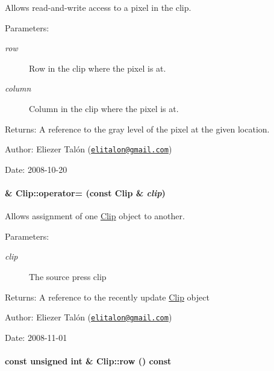 Allows read-and-write access to a pixel in the clip. 

\begin{Desc}
\item[Parameters:]
\begin{description}
\item[{\em row}]Row in the clip where the pixel is at. \item[{\em column}]Column in the clip where the pixel is at.\end{description}
\end{Desc}
\begin{Desc}
\item[Returns:]A reference to the gray level of the pixel at the given location.\end{Desc}
\begin{Desc}
\item[Author:]Eliezer Talón (\href{mailto:elitalon@gmail.com}{\tt elitalon@gmail.com}) \end{Desc}
\begin{Desc}
\item[Date:]2008-10-20 \end{Desc}
\hypertarget{class_clip_8f5c91715408d74402666ab79b952edd}{
\paragraph[{operator=}]{ \& Clip::operator= (const {\bf Clip} \& {\em clip})}\hfill}
\label{class_clip_8f5c91715408d74402666ab79b952edd}


Allows assignment of one \hyperlink{class_clip}{Clip} object to another. 

\begin{Desc}
\item[Parameters:]
\begin{description}
\item[{\em clip}]The source press clip\end{description}
\end{Desc}
\begin{Desc}
\item[Returns:]A reference to the recently update \hyperlink{class_clip}{Clip} object\end{Desc}
\begin{Desc}
\item[Author:]Eliezer Talón (\href{mailto:elitalon@gmail.com}{\tt elitalon@gmail.com}) \end{Desc}
\begin{Desc}
\item[Date:]2008-11-01 \end{Desc}
\hypertarget{class_clip_1a1d1fd626d1325f0f2b9184de4c89b8}{
\paragraph[{row}]{\setlength{\rightskip}{0pt plus 5cm}const unsigned int \& Clip::row () const}\hfill}
\label{class_clip_1a1d1fd626d1325f0f2b9184de4c89b8}


